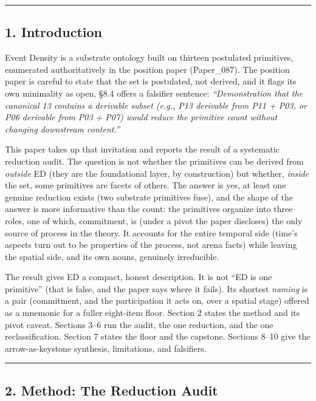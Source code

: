 \documentclass[
  11pt,
]{article}
\begin{document}
\begin{center}\rule{0.5\linewidth}{0.5pt}\end{center}

\subsection{1. Introduction}\label{introduction}

Event Density is a substrate ontology built on thirteen postulated
primitives, enumerated authoritatively in the position paper
(Paper\_087). The position paper is careful to state that the set is
postulated, not derived, and it flags its own minimality as open, §8.4
offers a falsifier sentence: \emph{``Demonstration that the canonical 13
contains a derivable subset (e.g., P13 derivable from P11 + P03, or P06
derivable from P03 + P07) would reduce the primitive count without
changing downstream content.''}

This paper takes up that invitation and reports the result of a
systematic reduction audit. The question is not whether the primitives
can be derived from \emph{outside} ED (they are the foundational layer,
by construction) but whether, \emph{inside} the set, some primitives are
facets of others. The answer is yes, at least one genuine reduction
exists (two substrate primitives fuse), and the shape of the answer is
more informative than the count: the primitives organize into three
roles, one of which, commitment, is (under a pivot the paper discloses)
the only source of process in the theory. It accounts for the entire
temporal side (time's aspects turn out to be properties of the process,
not arena facts) while leaving the spatial side, and its own nouns,
genuinely irreducible.

The result gives ED a compact, honest description. It is not ``ED is one
primitive'' (that is false, and the paper says where it fails). Its
shortest \emph{naming} is a pair (commitment, and the participation it
acts on, over a spatial stage) offered as a mnemonic for a fuller
eight-item floor. Section 2 states the method and its pivot caveat.
Sections 3--6 run the audit, the one reduction, and the one
reclassification. Section 7 states the floor and the capstone. Sections
8--10 give the arrow-as-keystone synthesis, limitations, and falsifiers.

\begin{center}\rule{0.5\linewidth}{0.5pt}\end{center}

\subsection{2. Method: The Reduction
Audit}\label{method-the-reduction-audit}
\end{document}
